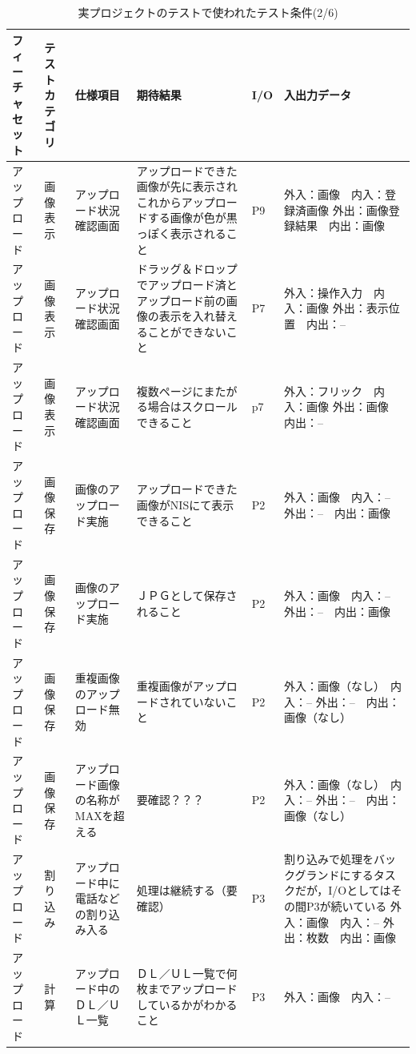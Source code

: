 \begin{table}[htbp]
  \scriptsize
  \centering
  \caption{実プロジェクトのテストで使われたテスト条件(2/6)}
  \begin{tabular}{|p{8em}|p{7em}|p{9em}|p{9em}|p{3em}|p{12em}|}
\cline{1-6}   フィーチャセット & テストカテゴリ  & 仕様項目 & 期待結果  & I/O   & 入出力データ \bigstrut\\
    \hline
    \hline
    アップロード & 画像表示  & \multicolumn{1}{p{8em}|}{アップロード状況確認画面} & アップロードできた画像が先に表示されこれからアップロードする画像が色が黒っぽく表示されること & P9    & 外入：画像　内入：登録済画像
外出：画像登録結果　内出：画像 \bigstrut\\
    \hline
    アップロード & 画像表示  & \multicolumn{1}{p{8em}|}{アップロード状況確認画面} & ドラッグ＆ドロップでアップロード済とアップロード前の画像の表示を入れ替えることができないこと & P7    & 外入：操作入力　内入：画像
外出：表示位置　内出：-- \bigstrut\\
    \hline
    アップロード & 画像表示  & \multicolumn{1}{p{8em}|}{アップロード状況確認画面} & 複数ページにまたがる場合はスクロールできること & p7    & 外入：フリック　内入：画像
外出：画像　内出：-- \bigstrut\\
    \hline
    アップロード & 画像保存  & \multicolumn{1}{p{8em}|}{画像のアップロード実施} & アップロードできた画像がNISにて表示できること & P2    & 外入：画像　内入：--
外出：--　内出：画像 \bigstrut\\
    \hline
    アップロード & 画像保存  & \multicolumn{1}{p{8em}|}{画像のアップロード実施} & ＪＰＧとして保存されること & P2    & 外入：画像　内入：--
外出：--　内出：画像 \bigstrut\\
    \hline
    アップロード & 画像保存  & \multicolumn{1}{p{8em}|}{重複画像のアップロード無効} & 重複画像がアップロードされていないこと & P2    & 外入：画像（なし）　内入：--
外出：--　内出：画像（なし） \bigstrut\\
    \hline
    アップロード & 画像保存  & \multicolumn{1}{p{8em}|}{アップロード画像の名称がMAXを超える} & 要確認？？？ & P2    & 外入：画像（なし）　内入：--
外出：--　内出：画像（なし） \bigstrut\\
    \hline
    アップロード & 割り込み  & \multicolumn{1}{p{8em}|}{アップロード中に電話などの割り込み入る} & 処理は継続する（要確認） & P3    & 割り込みで処理をバックグランドにするタスクだが，I/Oとしてはその間P3が続いている
外入：画像　内入：--
外出：枚数　内出：画像 \bigstrut\\
    \hline
    アップロード & 計算    & \multicolumn{1}{p{8em}|}{アップロード中のＤＬ／ＵＬ一覧} & ＤＬ／ＵＬ一覧で何枚までアップロードしているかがわかること & P3    & 外入：画像　内入：--

\end{tabular}
\end{table}
